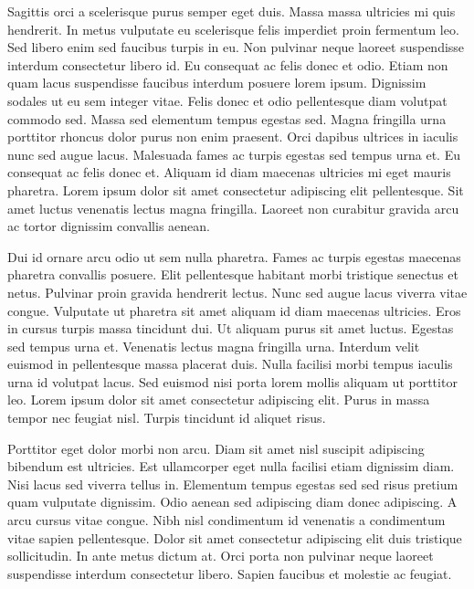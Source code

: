 \documentclass[letterpaper,10pt,english]{sphinxmanual}
\begin{document}
\sphinxAtStartPar
Sagittis orci a scelerisque purus semper eget duis. Massa massa ultricies mi quis hendrerit. In metus vulputate eu scelerisque felis imperdiet proin fermentum leo. Sed libero enim sed faucibus turpis in eu. Non pulvinar neque laoreet suspendisse interdum consectetur libero id. Eu consequat ac felis donec et odio. Etiam non quam lacus suspendisse faucibus interdum posuere lorem ipsum. Dignissim sodales ut eu sem integer vitae. Felis donec et odio pellentesque diam volutpat commodo sed. Massa sed elementum tempus egestas sed. Magna fringilla urna porttitor rhoncus dolor purus non enim praesent. Orci dapibus ultrices in iaculis nunc sed augue lacus. Malesuada fames ac turpis egestas sed tempus urna et. Eu consequat ac felis donec et. Aliquam id diam maecenas ultricies mi eget mauris pharetra. Lorem ipsum dolor sit amet consectetur adipiscing elit pellentesque. Sit amet luctus venenatis lectus magna fringilla. Laoreet non curabitur gravida arcu ac tortor dignissim convallis aenean.

\sphinxAtStartPar
Dui id ornare arcu odio ut sem nulla pharetra. Fames ac turpis egestas maecenas pharetra convallis posuere. Elit pellentesque habitant morbi tristique senectus et netus. Pulvinar proin gravida hendrerit lectus. Nunc sed augue lacus viverra vitae congue. Vulputate ut pharetra sit amet aliquam id diam maecenas ultricies. Eros in cursus turpis massa tincidunt dui. Ut aliquam purus sit amet luctus. Egestas sed tempus urna et. Venenatis lectus magna fringilla urna. Interdum velit euismod in pellentesque massa placerat duis. Nulla facilisi morbi tempus iaculis urna id volutpat lacus. Sed euismod nisi porta lorem mollis aliquam ut porttitor leo. Lorem ipsum dolor sit amet consectetur adipiscing elit. Purus in massa tempor nec feugiat nisl. Turpis tincidunt id aliquet risus.

\sphinxAtStartPar
Porttitor eget dolor morbi non arcu. Diam sit amet nisl suscipit adipiscing bibendum est ultricies. Est ullamcorper eget nulla facilisi etiam dignissim diam. Nisi lacus sed viverra tellus in. Elementum tempus egestas sed sed risus pretium quam vulputate dignissim. Odio aenean sed adipiscing diam donec adipiscing. A arcu cursus vitae congue. Nibh nisl condimentum id venenatis a condimentum vitae sapien pellentesque. Dolor sit amet consectetur adipiscing elit duis tristique sollicitudin. In ante metus dictum at. Orci porta non pulvinar neque laoreet suspendisse interdum consectetur libero. Sapien faucibus et molestie ac feugiat.
\end{document}
